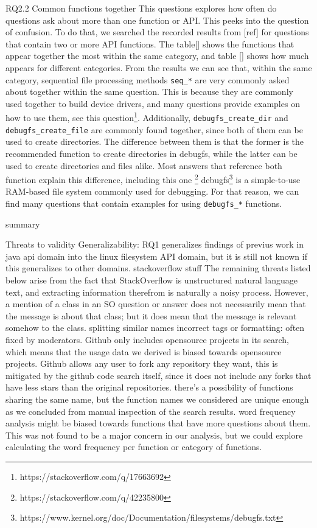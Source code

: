 RQ2.2
Common functions together
This questions explores how often do questions ask about more than one function or API. This peeks into the question of confusion. To do that, we searched the recorded results from [ref] for questions that contain two or more API functions. The table[] shows the functions that appear together the most within the same category, and table [] shows how much appears for different categories. From the results we can see that, within the same category, sequential file processing methods \texttt{seq\_*} are very commonly asked about together within the same question. This is because they are commonly used together to build device drivers, and many questions provide examples on how to use them, see this question\footnote{https://stackoverflow.com/q/17663692}.
Additionally, \texttt{debugfs\_create\_dir} and \texttt{debugfs\_create\_file} are commonly found together, since both of them can be used to create directories. The difference between them is that the former is the recommended function to create directories in debugfs, while the latter can be used to create directories and files alike. Most answers that reference both function explain this difference, including this one \footnote{https://stackoverflow.com/q/42235800}
debugfs\footnote{https://www.kernel.org/doc/Documentation/filesystems/debugfs.txt} is a simple-to-use RAM-based file system commonly used for debugging. For that reason, we can find many questions that contain examples for using \texttt{debugfs\_*} functions.


summary

Threats to validity
Generalizability:  RQ1 generalizes findings of previus work in java api domain into the linux filesystem API domain, but it is still not known if this generalizes to other domains.
stackoverflow stuff
The remaining threats listed below arise from the fact that StackOverflow is unstructured
natural language text, and extracting information therefrom is naturally a noisy
process.
However, a mention of a class in an SO question or answer does not necessarily mean
that the message is about that class; but it does mean that the message is relevant somehow
to the class.
splitting
similar names
incorrect tags or formatting: often fixed by moderators.
Github only includes opensource projects in its search, which means that the usage data we derived is biased towards opensource projects. Github allows any user to fork any repository they want, this is mitigated by the github code search itself, since it does not include any forks that have less stars than the original repositories. there's a possibility of functions sharing the same name, but the function names we considered are unique enough as we concluded from manual inspection of the search results.
word frequency analysis might be biased towards functions that have more questions about them. This was not found to be a major concern in our analysis, but we could explore calculating the word frequency per function or category of functions.

